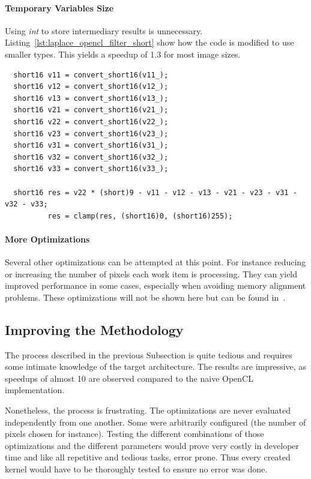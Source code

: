 \documentclass[11pt, a4paper, twoside]{montblanc}
\begin{document}
\paragraph{Temporary Variables Size} Using \textit{int} to store intermediary
results is unnecessary. Listing~\ref{lst:laplace_opencl_filter_short} show how
the code is modified to use smaller types. This yields a speedup of 1.3 for most
image sizes.

\begin{lstlisting}
  short16 v11 = convert_short16(v11_);
  short16 v12 = convert_short16(v12_);
  short16 v13 = convert_short16(v13_);
  short16 v21 = convert_short16(v21_);
  short16 v22 = convert_short16(v22_);
  short16 v23 = convert_short16(v23_);
  short16 v31 = convert_short16(v31_);
  short16 v32 = convert_short16(v32_);
  short16 v33 = convert_short16(v33_);

  short16 res = v22 * (short)9 - v11 - v12 - v13 - v21 - v23 - v31 - v32 - v33;
          res = clamp(res, (short16)0, (short16)255);
\end{lstlisting}

\paragraph{More Optimizations} Several other optimizations can be attempted at
this point. For instance reducing or increasing the number of pixels each work
item is processing. They can yield improved performance in some cases, especially
when avoiding memory alignment problems. These optimizations will not be shown
here but can be found in~\cite{opencl_arm_training}.

\subsection{Improving the Methodology}

The process described in the previous Subsection is quite tedious and requires
some intimate knowledge of the target architecture. The results are impressive,
as speedups of almost 10 are observed compared to the naive OpenCL
implementation.

Nonetheless, the process is frustrating. The optimizations are never evaluated
independently from one another. Some were arbitrarily configured (the number of
pixels chosen for instance). Testing the different combinations of those
optimizations and the different parameters would prove very costly in developer
time and like all repetitive and tedious tasks, error prone. Thus every created
kernel would have to be thoroughly tested to ensure no error was done.
\end{document}
